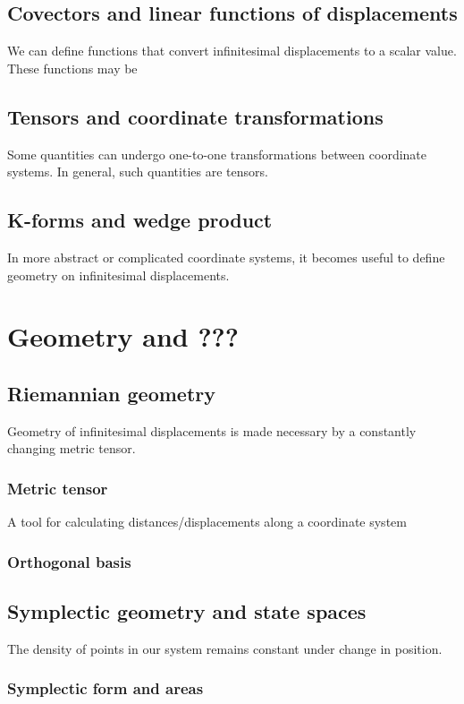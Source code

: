 \documentclass{book}
\begin{document}
\section{Covectors and linear functions of displacements}
We can define functions that convert infinitesimal displacements to a scalar value. These functions may be 
\section{Tensors and coordinate transformations}
Some quantities can undergo one-to-one transformations between coordinate systems. In general, such quantities are tensors. 
\section{K-forms and wedge product}
In more abstract or complicated coordinate systems, it becomes useful to define geometry on infinitesimal displacements. 
\chapter{Geometry and ???}

\section{Riemannian geometry}
Geometry of infinitesimal displacements is made necessary by a constantly changing metric tensor. 
\subsection{Metric tensor}
A tool for calculating distances/displacements along a coordinate system
\subsection{Orthogonal basis}

\section{Symplectic geometry and state spaces}
The density of points in our system remains constant under change in position. 

\subsection{Symplectic form and areas}
\end{document}

